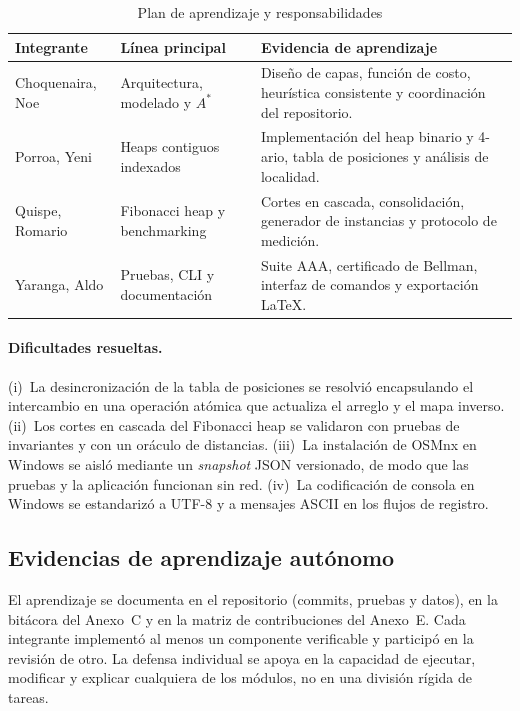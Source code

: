 \begin{table}[H]
    \centering
    \fontsize{9}{11}\selectfont
    \renewcommand{\arraystretch}{1.12}
    \caption{Plan de aprendizaje y responsabilidades}
    \label{tab:plan_aprendizaje}
    \begin{tabularx}{\textwidth}{@{}>{\raggedright\arraybackslash}p{3.2cm} >{\raggedright\arraybackslash}p{3.9cm} >{\raggedright\arraybackslash}X@{}}
        \toprule
        \textbf{Integrante} & \textbf{Línea principal} & \textbf{Evidencia de aprendizaje} \\
        \midrule
        Choquenaira, Noe & Arquitectura, modelado y $A^*$ & Diseño de capas, función de costo, heurística consistente y coordinación del repositorio. \\
        Porroa, Yeni & Heaps contiguos indexados & Implementación del heap binario y 4-ario, tabla de posiciones y análisis de localidad. \\
        Quispe, Romario & Fibonacci heap y benchmarking & Cortes en cascada, consolidación, generador de instancias y protocolo de medición. \\
        Yaranga, Aldo & Pruebas, CLI y documentación & Suite AAA, certificado de Bellman, interfaz de comandos y exportación LaTeX. \\
        \bottomrule
    \end{tabularx}
\end{table}

\paragraph{Dificultades resueltas.} (i)~La desincronización de la tabla de posiciones se resolvió encapsulando el intercambio en una operación atómica que actualiza el arreglo y el mapa inverso. (ii)~Los cortes en cascada del Fibonacci heap se validaron con pruebas de invariantes y con un oráculo de distancias. (iii)~La instalación de OSMnx en Windows se aisló mediante un \textit{snapshot} JSON versionado, de modo que las pruebas y la aplicación funcionan sin red. (iv)~La codificación de consola en Windows se estandarizó a UTF-8 y a mensajes ASCII en los flujos de registro.

\subsection{Evidencias de aprendizaje autónomo}
El aprendizaje se documenta en el repositorio (commits, pruebas y datos), en la bitácora del Anexo~C y en la matriz de contribuciones del Anexo~E. Cada integrante implementó al menos un componente verificable y participó en la revisión de otro. La defensa individual se apoya en la capacidad de ejecutar, modificar y explicar cualquiera de los módulos, no en una división rígida de tareas.
